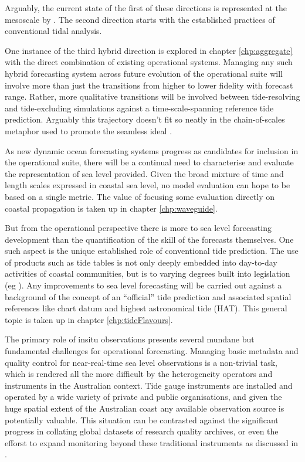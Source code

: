 Arguably, the current state of the first of these directions is represented at the mesoscale by \BL{}.   The second direction starts with the established practices of conventional tidal analysis.

One instance of the third hybrid direction is explored in chapter \ref{chp:aggregate} with the direct combination of existing operational systems.
Managing any such hybrid forecasting system across future evolution of the operational suite will involve more than just the transitions from higher to lower fidelity with forecast range.  Rather, more qualitative transitions will be involved between tide-resolving and tide-excluding simulations against a time-scale-spanning reference tide prediction.  Arguably this trajectory doesn't fit so neatly in the chain-of-scales metaphor used to promote the seamless ideal \citep{10.1175/bams-87-9-1195}.


As new dynamic ocean forecasting systems progress as candidates for inclusion in the operational suite, there will be a continual need to characterise and evaluate the representation of sea level provided.  Given the broad mixture of time and length scales expressed in coastal sea level, no model evaluation can hope to be based on a single metric.    The value of focusing some evaluation directly on coastal propagation is taken up in chapter \ref{chp:waveguide}.



But from the operational perspective there is more to sea level forecasting development than the quantification of the skill of the forecasts themselves.
One such aspect is the unique established role of conventional tide prediction.   The use of products such as tide tables is not only deeply embedded into day-to-day activities of coastal communities, but is to varying degrees built into legislation (eg \citep{AusNavAct2012}).   Any improvements to sea level forecasting will be carried out against a background of the concept of an ``official'' tide prediction and associated spatial references like chart datum and highest astronomical tide (HAT).    
This general topic is taken up in chapter \ref{chp:tideFlavours}.


The primary role of insitu observations presents several mundane but fundamental challenges for operational forecasting.
Managing basic metadata and quality control for near-real-time sea level observations is a non-trivial task, which is rendered all the more difficult by the heterogeneity operators and instruments in the Australian context.    Tide gauge instruments are installed and operated by a wide variety of private and public organisations, and given the huge spatial extent of the Australian coast any available observation source is potentially valuable. 
This situation can be contrasted against the significant progress in collating global datasets of research quality archives, or even the efforst to expand monitoring beyond these traditional instruments as discussed in \citet{10.3389/fmars.2019.00348}.



